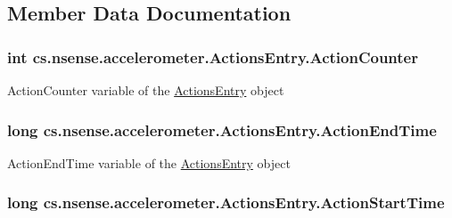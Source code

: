 \subsection{Member Data Documentation}
\hypertarget{classcs_1_1nsense_1_1accelerometer_1_1_actions_entry_a3aeb26da154427ad502786f25b343cc5}{
\subsubsection[{Action\-Counter}]{\setlength{\rightskip}{0pt plus 5cm}int cs.\-nsense.\-accelerometer.\-Actions\-Entry.\-Action\-Counter\hspace{0.3cm}{\ttfamily [private]}}}\label{classcs_1_1nsense_1_1accelerometer_1_1_actions_entry_a3aeb26da154427ad502786f25b343cc5}
Action\-Counter variable of the \hyperlink{classcs_1_1nsense_1_1accelerometer_1_1_actions_entry}{Actions\-Entry} object \hypertarget{classcs_1_1nsense_1_1accelerometer_1_1_actions_entry_a578b1fdb8588b46f4da203247638cbff}{
\subsubsection[{Action\-End\-Time}]{\setlength{\rightskip}{0pt plus 5cm}long cs.\-nsense.\-accelerometer.\-Actions\-Entry.\-Action\-End\-Time\hspace{0.3cm}{\ttfamily [private]}}}\label{classcs_1_1nsense_1_1accelerometer_1_1_actions_entry_a578b1fdb8588b46f4da203247638cbff}
Action\-End\-Time variable of the \hyperlink{classcs_1_1nsense_1_1accelerometer_1_1_actions_entry}{Actions\-Entry} object \hypertarget{classcs_1_1nsense_1_1accelerometer_1_1_actions_entry_abeef24315d46a17b5cf9b6416e6d03a3}{
\subsubsection[{Action\-Start\-Time}]{\setlength{\rightskip}{0pt plus 5cm}long cs.\-nsense.\-accelerometer.\-Actions\-Entry.\-Action\-Start\-Time\hspace{0.3cm}{\ttfamily [private]}}}\label{classcs_1_1nsense_1_1accelerometer_1_1_actions_entry_abeef24315d46a17b5cf9b6416e6d03a3}
